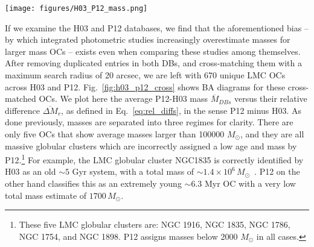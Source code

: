 \documentclass[a4paper,fleqn,usenatbib]{mnras}
\begin{document}
\begin{figure*}
\texttt{[image: figures/H03\_P12\_mass.png]}
\caption{\emph{Left}: BA plot for the relative difference between P12 minus H03
masses, for average mass values below 5000 $M_{\odot}$. OCs are coloured
according to the difference in their assigned logarithmic ages by each DB --
i.e.: $\Delta \log(age/yr)$ -- in the sense P12 minus H03; see colorbar in the
rightmost plot. The mean and standard deviation for $\overline{\Delta M}_r$ is
shown as a dashed black line and a grey region, respectively.
\emph{Centre}: idem, for average DB masses
$5000<\overline{M}_{DB}<20000\,(M_{\odot})$.
\emph{Right}: idem, for average DB masses
$\overline{M}_{DB}>20000\,(M_{\odot})$.}
\label{fig:h03_p12_cross}
\end{figure*}

If we examine the H03 and P12 databases, we find that the aforementioned bias
-- by which integrated photometric studies increasingly overestimate masses for
larger mass OCs -- exists even when comparing these studies among themselves.
%
After removing duplicated entries in both DBs, and cross-matching them with
a maximum search radius of 20 arcsec, we are left with 670 unique LMC OCs
across H03 and P12.
Fig.~\ref{fig:h03_p12_cross} shows BA diagrams for these cross-matched OCs.
We plot here the average P12-H03 mass $\overline{M}_{DBs}$
versus their relative difference $\overline{\Delta M}_r$, as defined in
Eq.~\ref{eq:rel_diffs}, in the sense P12 minus H03. As done previously, masses
are separated into three regimes for clarity.
%
There are only five OCs that show average masses larger than 100000
$M_{\odot}$, and they are all massive globular clusters which are incorrectly
assigned a low age and mass by P12.\footnote{These five LMC globular clusters
are: NGC 1916, NGC 1835, NGC 1786, NGC 1754, and NGC 1898. P12 assigns masses
below 2000 $M_{\odot}$ in all cases.}
For example, the LMC globular cluster NGC1835 is correctly identified by H03 as
an old ${\sim}5$ Gyr system, with a total mass of
$\sim1.4{\times}10^6\,M_{\odot}$~\citep[a reasonable value,
although a bit overestimated, according to][]{Dubath_1990}. P12 on the
other hand classifies this as an extremely young
${\sim}6.3$ Myr OC with a very low total mass estimate of $1700\,M_{\odot}$.
\end{document}
